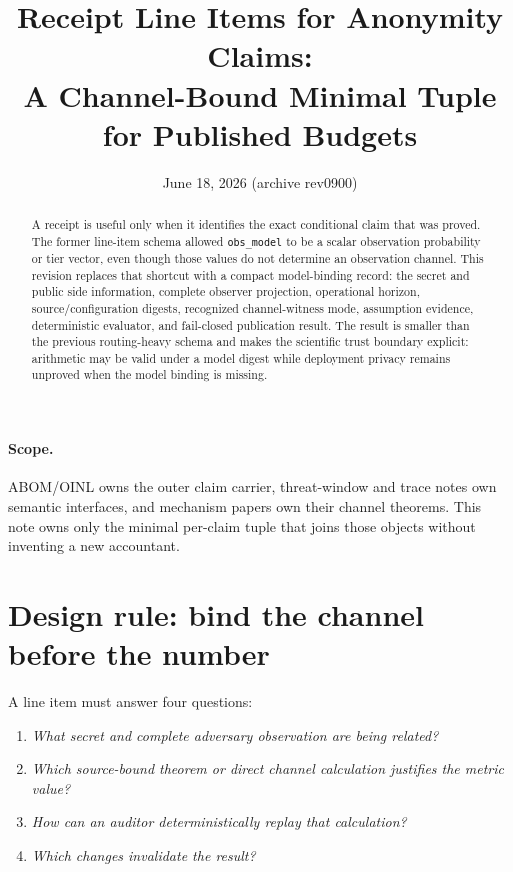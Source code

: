 \documentclass[11pt]{article}
\title{Receipt Line Items for Anonymity Claims:\\
\large A Channel-Bound Minimal Tuple for Published Budgets}
\author{}
\date{June 18, 2026 (archive rev0900)}
\begin{document}
\maketitle

\begin{abstract}
A receipt is useful only when it identifies the exact conditional claim that was proved. The former line-item schema allowed \texttt{obs\_model} to be a scalar observation probability or tier vector, even though those values do not determine an observation channel. This revision replaces that shortcut with a compact model-binding record: the secret and public side information, complete observer projection, operational horizon, source/configuration digests, recognized channel-witness mode, assumption evidence, deterministic evaluator, and fail-closed publication result. The result is smaller than the previous routing-heavy schema and makes the scientific trust boundary explicit: arithmetic may be valid under a model digest while deployment privacy remains unproved when the model binding is missing.
\end{abstract}

\paragraph{Scope.}
ABOM/OINL owns the outer claim carrier, threat-window and trace notes own semantic interfaces, and mechanism papers own their channel theorems. This note owns only the minimal per-claim tuple that joins those objects without inventing a new accountant.\cite{series:abomoinl,series:traceifaces,series:threatwindows,series:endpointbridge}

\section{Design rule: bind the channel before the number}\label{sec:rule}
A line item must answer four questions:
\begin{enumerate}[leftmargin=*]
\item \emph{What secret and complete adversary observation are being related?}
\item \emph{Which source-bound theorem or direct channel calculation justifies the metric value?}
\item \emph{How can an auditor deterministically replay that calculation?}
\item \emph{Which changes invalidate the result?}
\end{enumerate}
\end{document}
